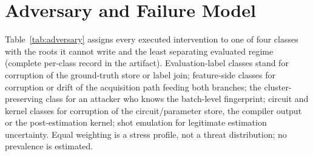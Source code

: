 \documentclass[10pt,journal,compsoc]{IEEEtran}
\begin{document}
\section{Adversary and Failure Model}

Table~\ref{tab:adversary} assigns every executed intervention to one of four
classes with the roots it cannot write and the least separating evaluated regime
(complete per-class record in the artifact). Evaluation-label classes stand
for corruption of the ground-truth store or label join; feature-side classes
for corruption or drift of the acquisition path feeding both branches; the
cluster-preserving class for an attacker who knows the batch-level
fingerprint; circuit and kernel classes for corruption of the
circuit/parameter store, the compiler output or the post-estimation kernel;
shot emulation for legitimate estimation uncertainty. Equal weighting is a
stress profile, not a threat distribution; no prevalence is estimated.
\end{document}
